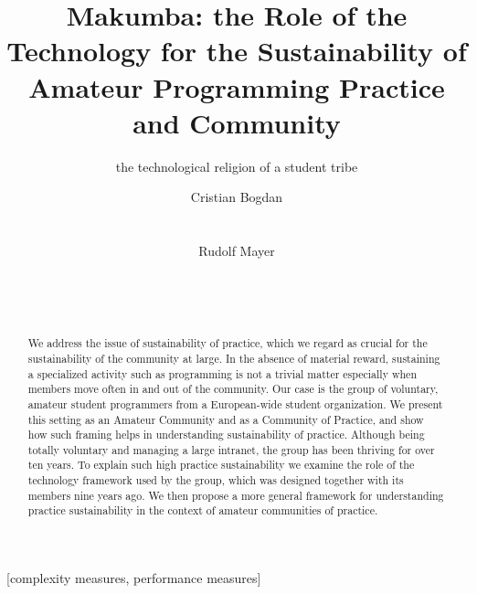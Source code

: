 \documentclass{acm_proc_article-sp}
\begin{document}
\title{Makumba: the Role of the Technology for the Sustainability of Amateur Programming Practice and Community}
\subtitle{the technological religion of a student tribe}

\author{
\alignauthor
Cristian Bogdan\\
       \\
       \\
\alignauthor
Rudolf Mayer\\
       \\
       \\
       \\
}

\maketitle
\begin{abstract}
We address the issue of sustainability of practice, which we regard as crucial for the sustainability of the community at large. In the absence of material reward, sustaining a specialized activity such as programming is not a trivial matter especially when members move often in and out of the community. Our case is the group of voluntary, amateur student programmers from a European-wide student organization. We present this setting as an Amateur Community and as a Community of Practice, and show how such framing helps in understanding sustainability of practice. Although being totally voluntary and managing a large intranet, the group has been thriving for over ten years. To explain such high practice sustainability we examine the role of the technology framework used by the group, which was designed together with its members nine years ago. We then propose a more general framework for understanding practice sustainability in the context of amateur communities of practice. 
\end{abstract}

[complexity measures, performance measures]
\end{document}

